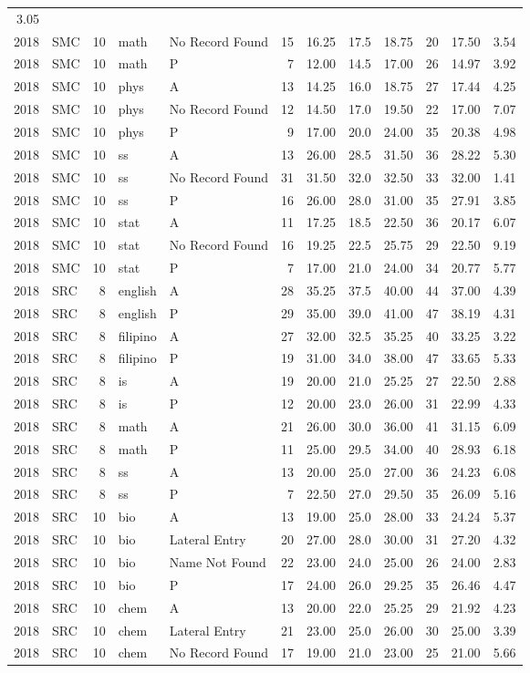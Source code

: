 \documentclass[]{article}
\begin{document}
\begin{longtable}[]{@{}rlrllrrrrrrr@{}}
3.05\tabularnewline
2018 & SMC & 10 & math & No Record Found & 15 & 16.25 & 17.5 & 18.75 &
20 & 17.50 & 3.54\tabularnewline
2018 & SMC & 10 & math & P & 7 & 12.00 & 14.5 & 17.00 & 26 & 14.97 &
3.92\tabularnewline
2018 & SMC & 10 & phys & A & 13 & 14.25 & 16.0 & 18.75 & 27 & 17.44 &
4.25\tabularnewline
2018 & SMC & 10 & phys & No Record Found & 12 & 14.50 & 17.0 & 19.50 &
22 & 17.00 & 7.07\tabularnewline
2018 & SMC & 10 & phys & P & 9 & 17.00 & 20.0 & 24.00 & 35 & 20.38 &
4.98\tabularnewline
2018 & SMC & 10 & ss & A & 13 & 26.00 & 28.5 & 31.50 & 36 & 28.22 &
5.30\tabularnewline
2018 & SMC & 10 & ss & No Record Found & 31 & 31.50 & 32.0 & 32.50 & 33
& 32.00 & 1.41\tabularnewline
2018 & SMC & 10 & ss & P & 16 & 26.00 & 28.0 & 31.00 & 35 & 27.91 &
3.85\tabularnewline
2018 & SMC & 10 & stat & A & 11 & 17.25 & 18.5 & 22.50 & 36 & 20.17 &
6.07\tabularnewline
2018 & SMC & 10 & stat & No Record Found & 16 & 19.25 & 22.5 & 25.75 &
29 & 22.50 & 9.19\tabularnewline
2018 & SMC & 10 & stat & P & 7 & 17.00 & 21.0 & 24.00 & 34 & 20.77 &
5.77\tabularnewline
2018 & SRC & 8 & english & A & 28 & 35.25 & 37.5 & 40.00 & 44 & 37.00 &
4.39\tabularnewline
2018 & SRC & 8 & english & P & 29 & 35.00 & 39.0 & 41.00 & 47 & 38.19 &
4.31\tabularnewline
2018 & SRC & 8 & filipino & A & 27 & 32.00 & 32.5 & 35.25 & 40 & 33.25 &
3.22\tabularnewline
2018 & SRC & 8 & filipino & P & 19 & 31.00 & 34.0 & 38.00 & 47 & 33.65 &
5.33\tabularnewline
2018 & SRC & 8 & is & A & 19 & 20.00 & 21.0 & 25.25 & 27 & 22.50 &
2.88\tabularnewline
2018 & SRC & 8 & is & P & 12 & 20.00 & 23.0 & 26.00 & 31 & 22.99 &
4.33\tabularnewline
2018 & SRC & 8 & math & A & 21 & 26.00 & 30.0 & 36.00 & 41 & 31.15 &
6.09\tabularnewline
2018 & SRC & 8 & math & P & 11 & 25.00 & 29.5 & 34.00 & 40 & 28.93 &
6.18\tabularnewline
2018 & SRC & 8 & ss & A & 13 & 20.00 & 25.0 & 27.00 & 36 & 24.23 &
6.08\tabularnewline
2018 & SRC & 8 & ss & P & 7 & 22.50 & 27.0 & 29.50 & 35 & 26.09 &
5.16\tabularnewline
2018 & SRC & 10 & bio & A & 13 & 19.00 & 25.0 & 28.00 & 33 & 24.24 &
5.37\tabularnewline
2018 & SRC & 10 & bio & Lateral Entry & 20 & 27.00 & 28.0 & 30.00 & 31 &
27.20 & 4.32\tabularnewline
2018 & SRC & 10 & bio & Name Not Found & 22 & 23.00 & 24.0 & 25.00 & 26
& 24.00 & 2.83\tabularnewline
2018 & SRC & 10 & bio & P & 17 & 24.00 & 26.0 & 29.25 & 35 & 26.46 &
4.47\tabularnewline
2018 & SRC & 10 & chem & A & 13 & 20.00 & 22.0 & 25.25 & 29 & 21.92 &
4.23\tabularnewline
2018 & SRC & 10 & chem & Lateral Entry & 21 & 23.00 & 25.0 & 26.00 & 30
& 25.00 & 3.39\tabularnewline
2018 & SRC & 10 & chem & No Record Found & 17 & 19.00 & 21.0 & 23.00 &
25 & 21.00 & 5.66\tabularnewline

\end{longtable}
\end{document}
